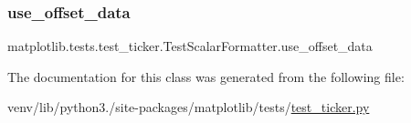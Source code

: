 \subsubsection{\texorpdfstring{use\+\_\+offset\+\_\+data}{use\_offset\_data}}
{\footnotesize\ttfamily matplotlib.\+tests.\+test\+\_\+ticker.\+Test\+Scalar\+Formatter.\+use\+\_\+offset\+\_\+data\hspace{0.3cm}{\ttfamily [static]}}



The documentation for this class was generated from the following file\+:\begin{DoxyCompactItemize}
\item 
venv/lib/python3./site-\/packages/matplotlib/tests/\hyperlink{test__ticker_8py}{test\+\_\+ticker.\+py}\end{DoxyCompactItemize}
